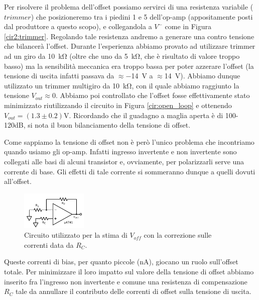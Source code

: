 Per risolvere il problema dell'offset possiamo servirci di una resistenza variabile ($trimmer$) che posizioneremo tra i piedini 1 e 5 dell'op-amp (appositamente posti dal produttore a questo scopo), e collegandola a $V^-$ come in Figura \ref{cir2:trimmer}. Regolando tale resistenza andremo a generare una contro tensione che bilancerà l'offset. Durante l'esperienza abbiamo provato ad utilizzare trimmer ad un giro da \SI{10}{\kilo\ohm} (oltre che uno da \SI{5}{\kilo\ohm}, che è risultato di valore troppo basso) ma la sensibilità meccanica era troppo bassa per poter azzerare l'offset (la tensione di uscita infatti passava da $\approx$\SI{-14}{\volt} a $\approx$\SI{+14}{\volt}). Abbiamo dunque utilizzato un trimmer multigiro da \SI{10}{\kilo\ohm}, con il quale abbiamo raggiunto la tensione $V_{out}\approx 0$. Abbiamo poi controllato che l'offset fosse effettivamente stato minimizzato riutilizzando il circuito in Figura \ref{cir:open_loop} e ottenendo $V_{out}= (1.3\pm0.2)\si{\volt}$. Ricordando che il guadagno a maglia aperta è di 100-120dB, si nota il buon bilanciamento della tensione di offset.

Come sappiamo la tensione di offset non è però l'unico problema che incontriamo quando usiamo gli op-amp. Infatti ingresso invertente e non invertente sono collegati alle basi di alcuni transistor e, ovviamente, per polarizzarli serve una corrente di base. Gli effetti di tale corrente si sommeranno dunque a quelli dovuti all'offset.

\begin{figure}
  \begin{center}
    \includegraphics[width=0.280\textwidth]{../E02/latex/current_correction.pdf}
  \end{center}
  \caption{Circuito utilizzato per la stima di $V_{off}$ con la correzione sulle correnti data da $R_C$.}
  \label{cir2:current_correction}
\end{figure}

Queste correnti di bias, per quanto piccole (\si{\nano\ampere}), giocano un ruolo sull'offset totale. Per minimizzare il loro impatto sul valore della tensione di offset abbiamo inserito fra l'ingresso non invertente e comune una resistenza di compensazione $R_C$ tale da annullare il contributo delle correnti di offset sulla tensione di uscita.

